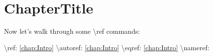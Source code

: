 
\chapter[ChapterShortTitle]{ChapterTitle}

Now let's walk through some \textbackslash ref commands:

\begin{exe}
    \ex \textbackslash ref: \ref{chap:Intro}
    \ex \textbackslash autoref: \autoref{chap:Intro}
    \ex \textbackslash eqref: \eqref{chap:Intro}
    \ex \textbackslash nameref: 
    
\end{exe}

